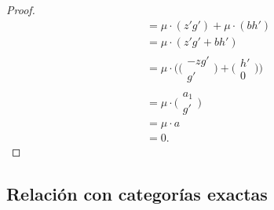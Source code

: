 \documentclass[tesis]{subfiles}
\begin{document}
\begin{proof}
\begin{align*}
                                          &= \mu\cdot(z'g') + \mu\cdot(bh') \\
                                          &= \mu\cdot(z'g' + bh') \\
                                          &= \mu\cdot\big( \big(\begin{smallmatrix} -zg' \\ g' \end{smallmatrix}\big) + \big(\begin{smallmatrix} h' \\ 0 \end{smallmatrix}\big) \big) \\
                                          &= \mu\cdot\big( \begin{smallmatrix} a_1 \\ g' \end{smallmatrix} \big) \tag{pues $zg' = h-a_1$} \\
                                          &= \mu\cdot a \\
                                          &= 0.
    \end{align*}
\end{proof}

\subsection*{Relación con categorías exactas} \label{Ssec: Relación con categorías exactas}
\end{document}

